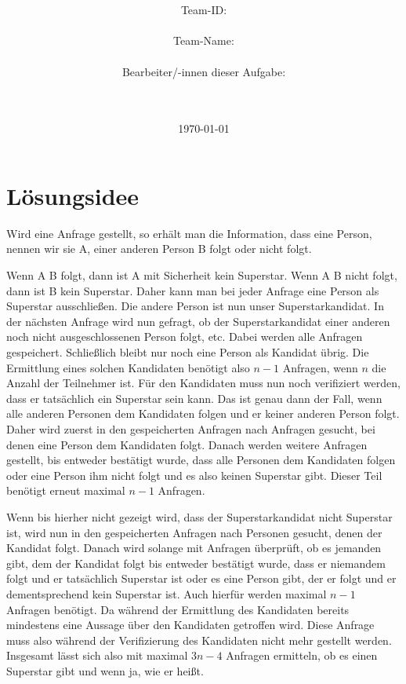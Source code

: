 \documentclass[a4paper,10pt,ngerman]{scrartcl}
\title{\textbf{\Huge\Aufgabe}}
\author{\LARGE Team-ID: \LARGE \TeamID \\\\
	    \LARGE Team-Name: \LARGE \TeamName \\\\
	    \LARGE Bearbeiter/-innen dieser Aufgabe: \\ 
	    \LARGE \Namen\\\\}
\date{\LARGE\today}
\begin{document}
\maketitle
\tableofcontents

\section{Lösungsidee}
Wird eine Anfrage gestellt, so erhält man die Information, dass eine Person, nennen wir sie A, einer anderen Person B folgt oder nicht folgt.

Wenn A B folgt, dann ist A mit Sicherheit kein Superstar. Wenn A B nicht folgt, dann ist B kein Superstar. Daher kann man bei jeder Anfrage eine Person als Superstar ausschließen.
Die andere Person ist nun unser Superstarkandidat.
In der nächsten Anfrage wird nun gefragt, ob der Superstarkandidat einer anderen noch nicht ausgeschlossenen Person folgt, etc. Dabei werden alle Anfragen gespeichert.
Schließlich bleibt nur noch eine Person als Kandidat übrig. Die Ermittlung eines solchen Kandidaten benötigt also $n-1$ Anfragen, wenn $n$ die Anzahl der Teilnehmer ist.
Für den Kandidaten muss nun noch verifiziert werden, dass er tatsächlich ein Superstar sein kann. Das ist genau dann der Fall, wenn alle anderen Personen dem Kandidaten folgen und er keiner anderen Person folgt. Daher wird zuerst in den gespeicherten Anfragen nach Anfragen gesucht, bei denen eine Person dem Kandidaten folgt. Danach werden weitere Anfragen gestellt, bis entweder bestätigt wurde, dass alle Personen dem Kandidaten folgen oder eine Person ihm nicht folgt und es also keinen Superstar gibt. Dieser Teil benötigt erneut maximal $n-1$ Anfragen.

Wenn bis hierher nicht gezeigt wird, dass der Superstarkandidat nicht Superstar ist, wird nun in den gespeicherten Anfragen nach Personen gesucht, denen der Kandidat folgt.
Danach wird solange mit Anfragen überprüft, ob es jemanden gibt, dem der Kandidat folgt bis entweder bestätigt wurde, dass er niemandem folgt und er tatsächlich Superstar ist oder es eine Person gibt, der er folgt und er dementsprechend kein Superstar ist. Auch hierfür werden maximal $n-1$ Anfragen benötigt. Da während der Ermittlung des Kandidaten bereits mindestens eine Aussage über den Kandidaten getroffen wird. Diese Anfrage muss also während der Verifizierung des Kandidaten nicht mehr gestellt werden. Insgesamt lässt sich also mit maximal $3n-4$ Anfragen ermitteln, ob es einen Superstar gibt und wenn ja, wie er heißt.
\end{document}
